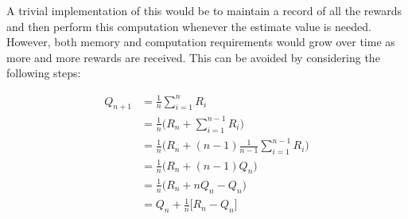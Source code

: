 A trivial implementation of this would be to maintain a record of all the rewards and then perform this computation whenever the estimate value is needed. However, both memory and computation requirements would grow over time as more and more rewards are received. This can be avoided by considering the following steps:

\begin{equation*}
    \begin{split}
        Q_{n+1} & = \frac{1}{n} \sum_{i=1}^{n} R_i\\
        & = \frac{1}{n} \Big( R_n + \sum_{i=1}^{n-1} R_i \Big) \\
        & = \frac{1}{n} \Big( R_n + (n-1) \frac{1}{n-1} \sum_{i=1}^{n-1} R_i \Big) \\
        & = \frac{1}{n} \Big( R_n + (n-1) Q_n \Big) \\
        & = \frac{1}{n} \Big( R_n + n Q_n - Q_n \Big) \\
        & = Q_n + \frac{1}{n} \Big[R_n - Q_n \Big]
    \end{split}
\end{equation*}
